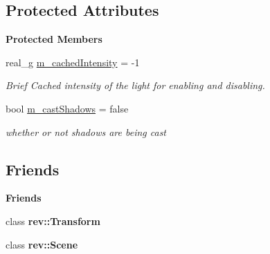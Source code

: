 \subsection*{Protected Attributes}
\begin{Indent}\textbf{ Protected Members}\par
\begin{DoxyCompactItemize}
\item 
\mbox{\label{classrev_1_1_light_component_a110854d27d0dedb0db3c605f289ebe26}} 
real\+\_\+g \mbox{\hyperlink{classrev_1_1_light_component_a110854d27d0dedb0db3c605f289ebe26}{m\+\_\+cached\+Intensity}} = -\/1
\begin{DoxyCompactList}\small\item\em Brief Cached intensity of the light for enabling and disabling. \end{DoxyCompactList}\item 
\mbox{\label{classrev_1_1_light_component_a03c520a3eabd47fb5c687572e8c2369c}} 
bool \mbox{\hyperlink{classrev_1_1_light_component_a03c520a3eabd47fb5c687572e8c2369c}{m\+\_\+cast\+Shadows}} = false
\begin{DoxyCompactList}\small\item\em whether or not shadows are being cast \end{DoxyCompactList}\end{DoxyCompactItemize}
\end{Indent}
\subsection*{Friends}
\begin{Indent}\textbf{ Friends}\par
\begin{DoxyCompactItemize}
\item 
\mbox{\label{classrev_1_1_light_component_a6cc6b71ce10e2eec16b7396426334df8}} 
class {\bfseries rev\+::\+Transform}
\item 
\mbox{\label{classrev_1_1_light_component_ad749f3b6f8055427b798047faaa6407b}} 
class {\bfseries rev\+::\+Scene}
\end{DoxyCompactItemize}
\end{Indent}
